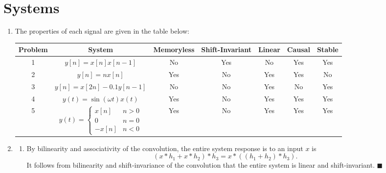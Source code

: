 \documentclass[11pt]{article}
\renewcommand{\qed}{\quad $\blacksquare$}
\begin{document}
\newpage
\section{Systems}
\begin{enumerate}[1.]
\item The properties of each signal are given in the table below:
\vspace{-0.2in}
\begin{center}
\newcommand\sysfive{
\left\{
    \begin{array}{cl}
        x[n]    &   n > 0   \\
        0       &   n = 0   \\
        -x[n]   &   n < 0
    \end{array}
\right.
}
\begin{tabular}{|c|c|c|c|c|c|c|}
\hline
Problem     & System                        & Memoryless   & Shift-Invariant
    & Linear    & Causal    & Stable    \\
\hline
1           & $y[n] = x[n]x[n - 1]$         & No           & Yes
    & No        & Yes       & Yes       \\
\hline
2           & $y[n] = nx[n]$                & Yes          & No
    & Yes       & Yes       & No        \\
\hline
3           & $y[n] = x[2n] - 0.1y[n - 1]$  & No           & No
    & Yes       & No        & Yes       \\
\hline
4           & $y(t) = \sin(\omega t)x(t)$   & Yes           & No
    & Yes       & Yes       & Yes       \\
\hline
5           & $y(t) = \sysfive$             & Yes           & No
    & Yes       & Yes       & Yes       \\
\hline
\end{tabular}
\end{center}

\item
\begin{enumerate}[1.]
\item
By bilinearity and associativity of the convolution, the entire system response
is to an input $x$ is
\[(x * h_1 + x * h_2) * h_3 = x * ((h_1 + h_2) * h_3).\]
It follows from bilinearity and shift-invariance of the convolution that the
entire system is linear and shift-invariant. \qed


\end{enumerate}
\end{enumerate}
\end{document}
